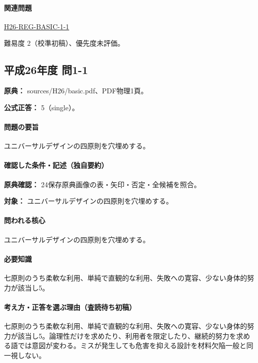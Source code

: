 \paragraph{関連問題} \hyperref[q:h26-reg-basic-1-1]{H26-REG-BASIC-1-1}

\par 難易度 2（校準初稿）、優先度未評価。

\subsection{平成26年度 問1-1}
\label{q:h26-reg-basic-1-1}

\noindent\textbf{原典：} sources/H26/basic.pdf、PDF物理1頁。

\textbf{公式正答：} 5（single）。

\paragraph{問題の要旨} ユニバーサルデザインの四原則を穴埋めする。

\paragraph{確認した条件・記述（独自要約）}\mbox{}\par

\noindent\textbf{原典確認：} 24保存原典画像の表・矢印・否定・全候補を照合。\par

\noindent\textbf{対象：} ユニバーサルデザインの四原則を穴埋めする。\par

\paragraph{問われる核心} ユニバーサルデザインの四原則を穴埋めする。

\paragraph{必要知識} 七原則のうち柔軟な利用、単純で直観的な利用、失敗への寛容、少ない身体的努力が該当し5。

\paragraph{考え方・正答を選ぶ理由（査読待ち初稿）} 七原則のうち柔軟な利用、単純で直観的な利用、失敗への寛容、少ない身体的努力が該当し5。論理性だけを求めたり、利用者を限定したり、継続的努力を求める語では意図が変わる。ミスが発生しても危害を抑える設計を材料欠陥一般と同一視しない。

